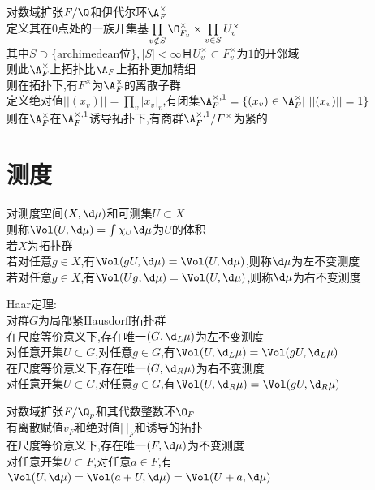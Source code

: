 \begin{dingli}
对数域扩张$F/\Q$和伊代尔环$\A_{F}^{\times}$\\
定义其在$0$点处的一族开集基$\prod\limits_{v\notin S}\O_{F_v}^{\times}\times\prod\limits_{v\in S}U_v^{\times}$\\
其中$S\supset \{\text{archimedean位}\},|S|<\infty$且$U_{v}^{\times}\subset F_{v}^{\times}$为$1$的开邻域\\
则此$\A_{F}^{\times}$上拓扑比$\A_{F}$上拓扑更加精细\\
则在拓扑下,有$F^{\times}$为$\A_{F}^{\times}$的离散子群\\
定义绝对值$||(x_v)||=\prod\limits_{v}|x_v|_v$,有闭集$\A_{F}^{\times,1}=\{(x_v)\in\A_{F}^{\times}|\ ||(x_v)||=1\}$\\
则在$\A_{F}^{\times}$在$\A_{F}^{\times,1}$诱导拓扑下,有商群$\A_{F}^{\times,1}/F^{\times}$为紧的
\end{dingli}

\chapter{测度}

\begin{dingyi}
对测度空间$(X,\d \mu)$和可测集$U\subset X$\\
则称$\Vol(U,\d \mu)=\int \chi_{U}\d\mu$为$U$的体积\\
若$X$为拓扑群\\
若对任意$g\in X$,有$\Vol(gU,\d\mu)=\Vol(U,\d\mu)$,则称$\d\mu$为左不变测度\\
若对任意$g\in X$,有$\Vol(Ug,\d\mu)=\Vol(U,\d\mu)$,则称$\d\mu$为右不变测度
\end{dingyi}

\begin{dingli}
Haar定理:\\
对群$G$为局部紧Hausdorff拓扑群\\
在尺度等价意义下,存在唯一$(G,\d_{L}\mu)$为左不变测度\\
对任意开集$U\subset G$,对任意$g\in G$,有$\Vol(U,\d_{L}\mu)=\Vol(gU,\d_{L}\mu)$\\
在尺度等价意义下,存在唯一$(G,\d_{R}\mu)$为右不变测度\\
对任意开集$U\subset G$,对任意$g\in G$,有$\Vol(U,\d_{R}\mu)=\Vol(gU,\d_{R}\mu)$
\end{dingli}

\begin{dingli}
对数域扩张$F/\Q_{p}$和其代数整数环$\O_{F}$\\
有离散赋值$v_{F}$和绝对值$|\ |_{F}$和诱导的拓扑\\
在尺度等价意义下,存在唯一$(F,\d\mu)$为不变测度\\
对任意开集$U\subset F$,对任意$a\in F$,有$\Vol(U,\d\mu)=\Vol(a+U,\d\mu)=\Vol(U+a,\d\mu)$
\end{dingli}


